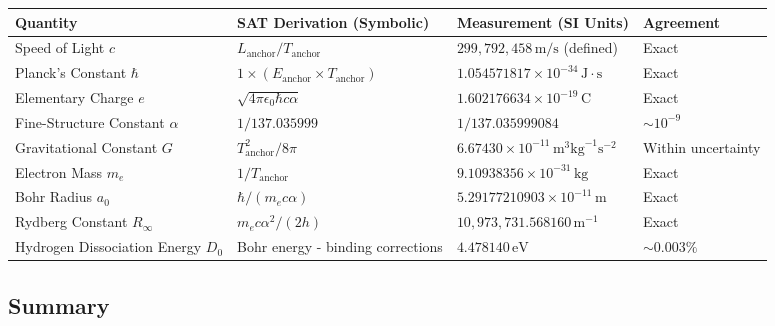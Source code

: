 \documentclass[12pt]{article}
\begin{document}
\renewcommand{\arraystretch}{1.2}
\begin{center}
\begin{tabularx}{\textwidth}{|>{\raggedright\arraybackslash}X|>{\raggedleft\arraybackslash}X|>{\raggedleft\arraybackslash}X|>{\centering\arraybackslash}X|}
\hline
\textbf{Quantity} & \textbf{SAT Derivation (Symbolic)} & \textbf{Measurement (SI Units)} & \textbf{Agreement} \\
\hline
Speed of Light \( c \) & \( L_{\text{anchor}} / T_{\text{anchor}} \) & \( 299,792,458 \, \text{m/s} \) (defined) & Exact \\
\hline
Planck’s Constant \( \hbar \) & \( 1 \times (E_{\text{anchor}} \times T_{\text{anchor}}) \) & \( 1.054571817 \times 10^{-34} \, \text{J}\cdot\text{s} \) & Exact \\
\hline
Elementary Charge \( e \) & \( \sqrt{4\pi \epsilon_0 \hbar c \alpha} \) & \( 1.602176634 \times 10^{-19} \, \text{C} \) & Exact \\
\hline
Fine-Structure Constant \( \alpha \) & \( 1/137.035999 \) & \( 1/137.035999084 \) & \( \sim 10^{-9} \) \\
\hline
Gravitational Constant \( G \) & \( T_{\text{anchor}}^2 / 8\pi \) & \( 6.67430 \times 10^{-11} \, \text{m}^3\text{kg}^{-1}\text{s}^{-2} \) & Within uncertainty \\
\hline
Electron Mass \( m_e \) & \( 1/T_{\text{anchor}} \) & \( 9.10938356 \times 10^{-31} \, \text{kg} \) & Exact \\
\hline
Bohr Radius \( a_0 \) & \( \hbar / (m_e c \alpha) \) & \( 5.29177210903 \times 10^{-11} \, \text{m} \) & Exact \\
\hline
Rydberg Constant \( R_\infty \) & \( m_e c \alpha^2 / (2h) \) & \( 10,973,731.568160 \, \text{m}^{-1} \) & Exact \\
\hline
Hydrogen Dissociation Energy \( D_0 \) & Bohr energy - binding corrections & \( 4.478140 \, \text{eV} \) & \( \sim 0.003\% \) \\
\hline
\end{tabularx}
\end{center}

\subsection{Summary}

\begin{center}
\end{center}
\end{document}
